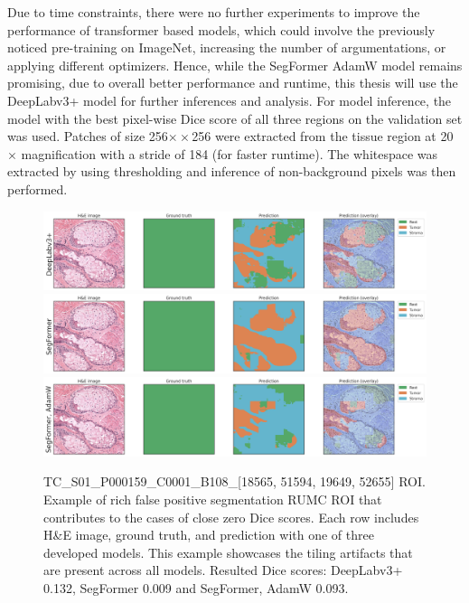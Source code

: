Due to time constraints, there were no further experiments to improve the performance of transformer
based models, which could involve the previously noticed pre-training on ImageNet, increasing
the number of argumentations, or applying different optimizers.
Hence, while the SegFormer AdamW model remains promising, due to overall better performance and
runtime, this thesis will use the DeepLabv3+ model for further inferences and analysis.
For model inference, the model with the best pixel-wise Dice score of all three regions on the validation set was used.
Patches of size 256$×\times$256 were extracted from the tissue region at 20$\times$ magnification
with a stride of 184 (for faster runtime). The whitespace was extracted by using thresholding and
inference of non-background pixels was then performed.

\begin{figure}[H]
    \includegraphics[width=\linewidth]{figures/tissue/deeplabv3+_dice_tc_TC_S01_P000159_C0001_B108_[18565,_51594,_19649,_52655]_nice.png}
    \includegraphics[width=\linewidth]{figures/tissue/segformer_dice_tc_TC_S01_P000159_C0001_B108_[18565,_51594,_19649,_52655]_nice.png}
    \includegraphics[width=\linewidth]{figures/tissue/segformer,_adamw_dice_tc_TC_S01_P000159_C0001_B108_[18565,_51594,_19649,_52655]_nice.png}
    \caption{TC\_S01\_P000159\_C0001\_B108\_[18565, 51594, 19649, 52655] ROI.
    Example of rich false positive segmentation RUMC ROI
    that contributes to the cases of close zero Dice scores. Each row includes H\&E image, ground truth, and prediction with
    one of three developed models. This example showcases the tiling artifacts that are present across all models.
    Resulted Dice scores: DeepLabv3+ 0.132, SegFormer 0.009 and SegFormer, AdamW 0.093.}
    \label{fig:TC_S01_P000159}
\end{figure}

